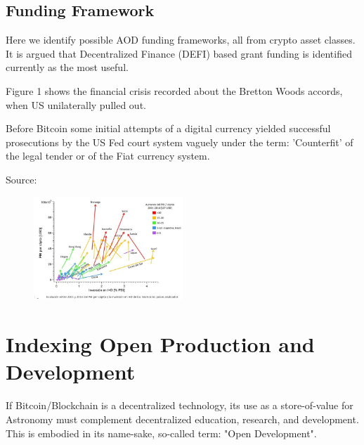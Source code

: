 \documentclass[final,5p,times,twocolumn,authoryear]{elsarticle}
\begin{document}
\subsection{Funding Framework}

Here we identify possible AOD funding frameworks, all from crypto asset classes.  It is argued that Decentralized Finance (DEFI) based grant funding is identified currently as the most useful.

Figure 1 shows the financial crisis recorded about the Bretton Woods accords, when US unilaterally pulled out.

Before Bitcoin some initial attempts of a digital currency yielded successful prosecutions by the US Fed court system vaguely under the term: 'Counterfit' of the legal tender or of the Fiat currency system. 

Source:  
 



\begin{figure}
    \centering
    \includegraphics[width=0.5\textwidth]{figs/Docuemnto_Stefani_2.jpg}
    \caption{\href{https://aargentinapciencias.org/wp-content/uploads/2019/05/Docuemnto_Stefani.pdf}{}} 
\end{figure}
\section{Indexing Open Production and Development}

If Bitcoin/Blockchain is a decentralized technology, its use as a store-of-value for Astronomy must complement decentralized education, research, and development. This is embodied in its name-sake, so-called term: "Open Development".
\end{document}
